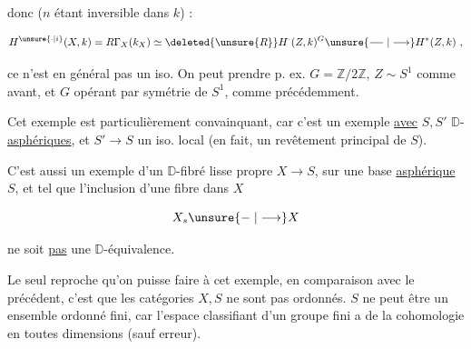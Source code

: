 
donc ($n$ étant inversible dans $k$) :

\[
H^{\unsure{\cdot|i}}(X,k)=R\Gamma_X(k_X)\simeq\deleted{\unsure{R}}H^{\cdot}(Z,k)^G\unsure{\relbar\joinrel\relbar|\longrightarrow}H^*(Z,k)\ ,
\]

ce n'est en général pas un iso. On peut prendre p. ex. $G=\mathbb Z/2\mathbb Z$, $Z\sim S^1$ comme avant, et $G$ opérant par symétrie de $S^1$, comme précédemment.

Cet exemple est particulièrement convainquant, car c'est un exemple \uline{avec} $S,S'$ $\mathbb D$-\uline{asphériques}, et $S'\to S$ un iso. local (en fait, un revêtement principal de $S$).

C'est aussi un exemple d'un $\mathbb D$-fibré lisse  propre $X\to S$, sur une base \uline{asphérique} $S$, et tel que l'inclusion d'une fibre dans $X$

\[
X_s\unsure{\relbar|\longrightarrow}X
\]

ne soit \uline{pas} une $\mathbb D$-équivalence.

Le seul reproche qu'on puisse faire à cet exemple, en comparaison avec le précédent, c'est que les catégories $X,S$ ne sont pas  ordonnés.  $S$ ne peut être un ensemble ordonné fini, car l'espace classifiant d'un groupe fini a de la cohomologie en toutes dimensions (sauf erreur).


